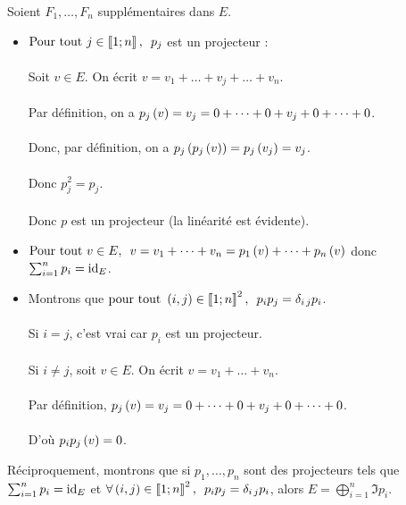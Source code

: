 \begin{dem}
Soient \(F_1,\dots,F_n\) supplémentaires dans \(E\).

\begin{itemize}
    \item \(\quantifs{\Tpt j\in\interventierii{1}{n}}p_j\) est un projecteur : \\\\ Soit \(v\in E\). On écrit \(v=v_1+\dots+v_j+\dots+v_n\). \\\\ Par définition, on a \(p_j\left(v\right)=v_j=0+\dots+0+v_j+0+\dots+0\). \\\\ Donc, par définition, on a \(p_j\left(p_j\left(v\right)\right)=p_j\left(v_j\right)=v_j\). \\\\ Donc \(p_j^2=p_j\). \\\\ Donc \(p\) est un projecteur (la linéarité est évidente). \\
    \item \(\quantifs{\Tpt v\in E}v=v_1+\dots+v_n=p_1\paren{v}+\dots+p_n\paren{v}\) donc \(\sum_{i=1}^np_i=\mathrm{id}_{E}\). \\
    \item Montrons que \(\quantifs{\tpt\paren{i,j}\in\interventierii{1}{n}^2}p_ip_j=\delta_{i\,j}p_i\). \\\\ Si \(i=j\), c'est vrai car \(p_i\) est un projecteur. \\\\ Si \(i\not=j\), soit \(v\in E\). On écrit \(v=v_1+\dots+v_n\). \\\\ Par définition, \(p_j\left(v\right)=v_j=0+\dots+0+v_j+0+\dots+0\). \\\\ D'où \(p_ip_j\left(v\right)=0\).
\end{itemize}

Réciproquement, montrons que si \(p_1,\dots,p_n\) sont des projecteurs tels que \(\sum_{i=1}^np_i=\mathrm{id}_{E}\) et \(\quantifs{\forall\paren{i,j}\in\interventierii{1}{n}^2}p_ip_j=\delta_{i\,j}p_i\), alors \(E=\bigoplus_{i=1}^n\Im p_i\).


\end{dem}
